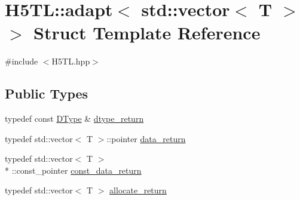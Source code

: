 \hypertarget{struct_h5_t_l_1_1adapt_3_01std_1_1vector_3_01_t_01_4_01_4}{\section{H5\-T\-L\-:\-:adapt$<$ std\-:\-:vector$<$ T $>$ $>$ Struct Template Reference}
\label{struct_h5_t_l_1_1adapt_3_01std_1_1vector_3_01_t_01_4_01_4}
}


{\ttfamily \#include $<$H5\-T\-L.\-hpp$>$}

\subsection*{Public Types}
\begin{DoxyCompactItemize}
\item 
typedef const \hyperlink{class_h5_t_l_1_1_d_type}{D\-Type} \& \hyperlink{struct_h5_t_l_1_1adapt_3_01std_1_1vector_3_01_t_01_4_01_4_a8ffca6b8ff7bf3a3c25a52d27f40febb}{dtype\-\_\-return}
\item 
typedef std\-::vector$<$ T $>$\-::pointer \hyperlink{struct_h5_t_l_1_1adapt_3_01std_1_1vector_3_01_t_01_4_01_4_a8ac9e6d104013a192b80a732918852ec}{data\-\_\-return}
\item 
typedef std\-::vector$<$ T $>$\\*
\-::const\-\_\-pointer \hyperlink{struct_h5_t_l_1_1adapt_3_01std_1_1vector_3_01_t_01_4_01_4_a51278a88e3f610f935350365d0d5102b}{const\-\_\-data\-\_\-return}
\item 
typedef std\-::vector$<$ T $>$ \hyperlink{struct_h5_t_l_1_1adapt_3_01std_1_1vector_3_01_t_01_4_01_4_a47c3e4fd67d82123fd8f2c9754502af6}{allocate\-\_\-return}
\end{DoxyCompactItemize}
